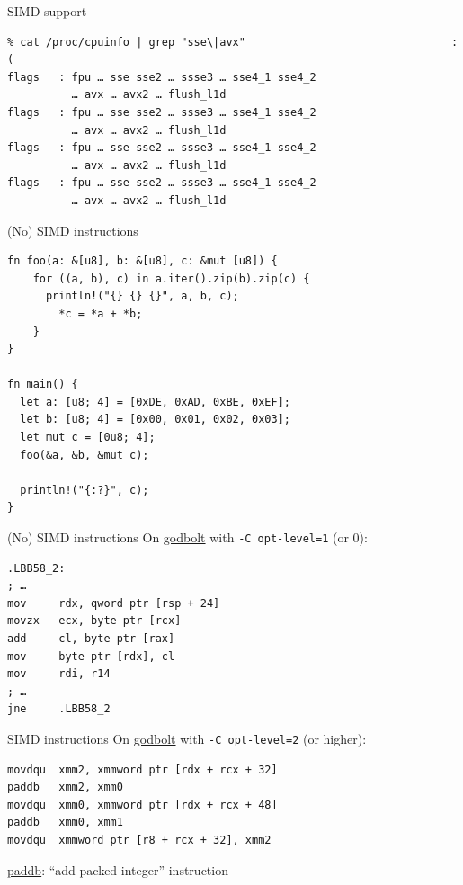 \documentclass{beamer}
\begin{document}
\begin{frame}[fragile]{SIMD support}
  \begin{verbatim}
% cat /proc/cpuinfo | grep "sse\|avx"                                :(
flags   : fpu … sse sse2 … ssse3 … sse4_1 sse4_2
          … avx … avx2 … flush_l1d
flags   : fpu … sse sse2 … ssse3 … sse4_1 sse4_2
          … avx … avx2 … flush_l1d
flags   : fpu … sse sse2 … ssse3 … sse4_1 sse4_2
          … avx … avx2 … flush_l1d
flags   : fpu … sse sse2 … ssse3 … sse4_1 sse4_2
          … avx … avx2 … flush_l1d
  \end{verbatim}
\end{frame}

\begin{frame}[fragile]{(No) SIMD instructions}
  \begin{verbatim}
fn foo(a: &[u8], b: &[u8], c: &mut [u8]) {
    for ((a, b), c) in a.iter().zip(b).zip(c) {
      println!("{} {} {}", a, b, c);
        *c = *a + *b;
    }
}

fn main() {
  let a: [u8; 4] = [0xDE, 0xAD, 0xBE, 0xEF];
  let b: [u8; 4] = [0x00, 0x01, 0x02, 0x03];
  let mut c = [0u8; 4];
  foo(&a, &b, &mut c);

  println!("{:?}", c);
}

  \end{verbatim}
\end{frame}

\begin{frame}[fragile]{(No) SIMD instructions}
  On \href{https://godbolt.org/z/678vhz}{godbolt} with \texttt{-C opt-level=1} (or 0):

  \begin{verbatim}
.LBB58_2:
; …
mov     rdx, qword ptr [rsp + 24]
movzx   ecx, byte ptr [rcx]
add     cl, byte ptr [rax]
mov     byte ptr [rdx], cl
mov     rdi, r14
; …
jne     .LBB58_2
  \end{verbatim}
\end{frame}

\begin{frame}[fragile]{SIMD instructions}
  On \href{https://godbolt.org/z/eKabj8}{godbolt} with \texttt{-C opt-level=2} (or higher):

  \begin{verbatim}
movdqu  xmm2, xmmword ptr [rdx + rcx + 32]
paddb   xmm2, xmm0
movdqu  xmm0, xmmword ptr [rdx + rcx + 48]
paddb   xmm0, xmm1
movdqu  xmmword ptr [r8 + rcx + 32], xmm2
  \end{verbatim}

  \href{https://www.felixcloutier.com/x86/paddb:paddw:paddd:paddq}{paddb}: \enquote{add packed integer} instruction
\end{frame}
\end{document}

